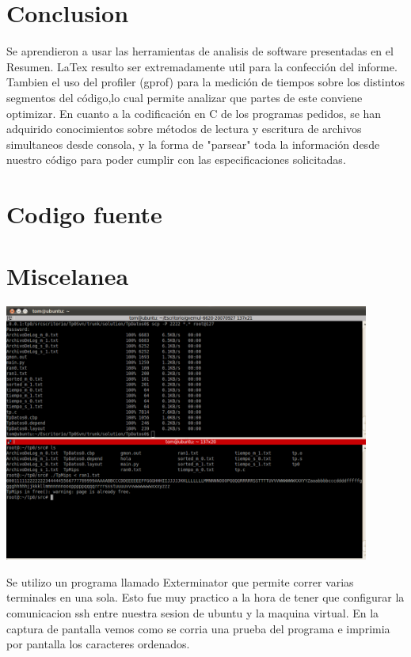 \section{Conclusion}
Se aprendieron a usar las herramientas de analisis de software presentadas en el Resumen.
LaTex resulto ser extremadamente util para la confección del informe. 
Tambien el uso del profiler (gprof) para la medición de tiempos sobre los distintos segmentos del código,lo cual permite analizar que partes de este conviene optimizar.
En cuanto a la codificación en C de los programas pedidos, se han adquirido conocimientos sobre métodos de lectura y escritura de archivos simultaneos desde consola, y la forma de "parsear" toda la información desde nuestro código para poder cumplir con las especificaciones solicitadas. 

\section{Codigo fuente}


\section{Miscelanea}
\includegraphics[width=12cm]{Imagenes/gxemul.PNG}

Se utilizo un programa llamado Exterminator que permite correr varias terminales en una sola.
Esto fue muy practico a la hora de tener que configurar la comunicacion ssh entre nuestra sesion de ubuntu y la maquina virtual.
En la captura de pantalla vemos como se corria una prueba del programa e imprimia por pantalla los caracteres ordenados.

